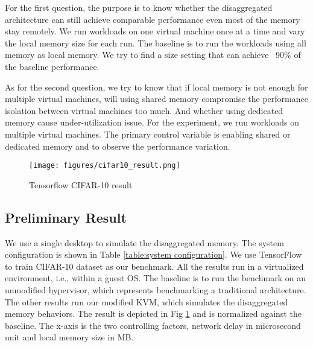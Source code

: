 \documentclass[twocolumn]{article}
\begin{document}
For the first question, the purpose is to know whether the disaggregated architecture can still achieve comparable performance even most of the memory stay remotely. We run workloads on one virtual machine once at a time and vary the local memory size for each run. The baseline is to run the workloads using all memory as local memory. We try to find a size setting that can achieve ~90\% of the baseline performance.

As for the second question, we try to know that if local memory is not enough for multiple virtual machines, will using shared memory compromise the performance isolation between virtual machines too much. And whether using dedicated memory cause under-utilization issue. For the experiment, we run workloads on multiple virtual machines. The primary control variable is enabling shared or dedicated memory and to observe the performance variation.

\begin{table}[h!]
    \caption{System configurations}
    \label{table:system configuration}
\end{table}

\begin{figure}[h!]
     \centering
     \texttt{[image: figures/cifar10\_result.png]}
     \caption{Tensorflow CIFAR-10 result}
     \label{fig:cifar-10 result}
\end{figure}

\subsection{Preliminary Result}                            
We use a single desktop to simulate the disaggregated memory. The system configuration is shown in Table \ref{table:system configuration}. We use TensorFlow to train CIFAR-10 dataset \cite{Tensorflow, CIFAR-10} as our benchmark. All the results run in a virtualized environment, i.e., within a guest OS. The baseline is to run the benchmark on an unmodified hypervisor, which represents benchmarking a traditional architecture. The other results run our modified KVM, which simulates the disaggregated memory behaviors. The result is depicted in Fig \ref{fig:cifar-10 result} and is normalized against the baseline. The x-axis is the two controlling factors, network delay in microsecond unit and local memory size in MB.
                                         
\end{document}
